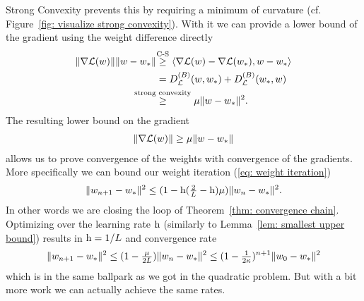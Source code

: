 Strong Convexity prevents this by requiring a minimum of curvature (cf.
Figure~\ref{fig: visualize strong convexity}). With it we can provide a lower
bound of the gradient using the weight difference directly
\begin{align}
	\nonumber
	\|\nabla\Loss(\weights)\|\|\weights -\minimum\|
	&\lxge{\text{C-S}} \langle \nabla\Loss(\weights) -\nabla\Loss(\minimum), \weights - \minimum \rangle\\
	\nonumber
	&= \bregmanDiv{\Loss}(\weights, \minimum) + \bregmanDiv{\Loss}(\minimum, \weights)\\
	\label{eq: strong convexity implies PL}
	&\lxge{\text{strong convexity}} \lbound \|\weights-\minimum\|^2.
\end{align}
The resulting lower bound on the gradient 
\begin{align*}
	\|\nabla\mathcal{L}(w)\|\ge \mu\|w -w_*\|
\end{align*}
allows us to prove convergence of the weights with convergence of the gradients.
More specifically we can bound our weight iteration (\ref{eq: weight iteration})
\begin{align*}
	\|w_{n+1}-w_*\|^2
	\le (1-\text{h}(\tfrac2{L} -\text{h})\mu)\|w_n - w_*\|^2.
\end{align*}
In other words we are closing the loop of Theorem~\ref{thm: convergence chain}.
Optimizing over the learning rate \(\text{h}\) (similarly to Lemma~\ref{lem: smallest
upper bound}) results in \(\text{h}=1/L\) and convergence rate
\begin{align*}
	\|w_{n+1}-w_*\|^2
	\le (1-\tfrac{\mu}{2L})\|w_n - w_*\|^2
	\le (1-\tfrac{1}{2\kappa})^{n+1}\|w_0-w_*\|^2
\end{align*}
%
which is in the same ballpark as we got in the quadratic problem. But with a bit
more work we can actually achieve the same rates.
%
